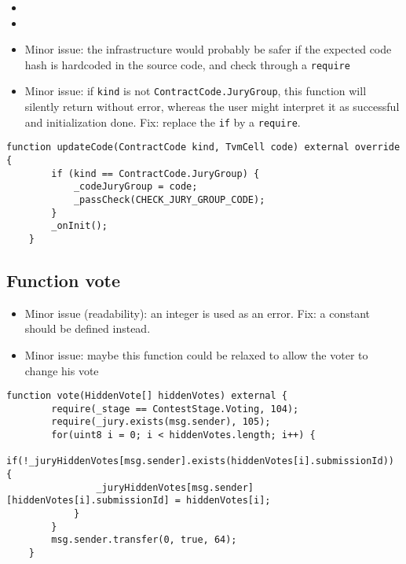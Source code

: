 \begin{itemize}
\item {}
\item {}
\item Minor issue: the infrastructure would probably be safer if the
  expected code hash is hardcoded in the source code, and check
  through a {\tt require}
\item Minor issue: if {\tt kind} is not {\tt ContractCode.JuryGroup},
  this function will silently return without error, whereas the user
  might interpret it as successful and initialization done. Fix:
  replace the {\tt if} by a {\tt require}.
\end{itemize}

\begin{lstlisting}[firstnumber=73]
    function updateCode(ContractCode kind, TvmCell code) external override {
        if (kind == ContractCode.JuryGroup) {
            _codeJuryGroup = code;
            _passCheck(CHECK_JURY_GROUP_CODE);
        }
        _onInit();
    }
\end{lstlisting}

\subsection{Function vote}

\begin{itemize}
\item Minor issue (readability): an integer is used as an error. Fix:
  a constant should be defined instead.
\item Minor issue: maybe this function could be relaxed to allow the
  voter to change his vote
\end{itemize}

\begin{lstlisting}[firstnumber=134]
    function vote(HiddenVote[] hiddenVotes) external {
        require(_stage == ContestStage.Voting, 104);
        require(_jury.exists(msg.sender), 105);
        for(uint8 i = 0; i < hiddenVotes.length; i++) {
            if(!_juryHiddenVotes[msg.sender].exists(hiddenVotes[i].submissionId)) {
                _juryHiddenVotes[msg.sender][hiddenVotes[i].submissionId] = hiddenVotes[i];
            }
        }
        msg.sender.transfer(0, true, 64);
    }
\end{lstlisting}

